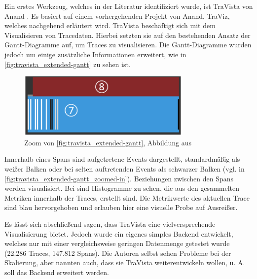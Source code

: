 Ein erstes Werkzeug, welches in der Literatur identifiziert wurde, ist TraVista von Anand \etal \cite{TraVistaPaper}. Es basiert auf einem vorhergehenden Projekt von Anand, TraViz, welches nachgehend erläutert wird. TraVista beschäftigt sich mit dem Visualisieren von Tracedaten. Hierbei setzten sie auf den bestehenden Ansatz der Gantt-Diagramme auf, um Traces zu visualisieren. Die Gantt-Diagramme wurden jedoch um einige zusätzliche Informationen erweitert, wie in \autoref{fig:travista_extended-gantt} zu sehen ist.

\begin{figure}
\centering
\vspace{-1.5\baselineskip}
\includegraphics[width=\linewidth]{img/03_methoden/travista_extended-gantt_zoomed-in.png}
\caption{Zoom von \autoref{fig:travista_extended-gantt}, Abbildung aus \cite{TraVistaPaper}}
\label{fig:travista_extended-gantt_zoomed-in}
\end{figure}

Innerhalb eines Spans sind aufgetretene Events dargestellt, standardmäßig als weißer Balken oder bei selten auftretenden Events als schwarzer Balken (vgl.  in \autoref{fig:travista_extended-gantt_zoomed-in}). Beziehungen  zwischen den Spans werden visualisiert. Bei  sind Histogramme zu sehen, die aus den gesammelten Metriken innerhalb der Traces, erstellt sind. Die Metrikwerte des aktuellen Trace sind blau hervorgehoben und erlauben hier eine visuelle Probe auf Ausreißer.

Es lässt sich abschließend sagen, dass TraVista eine vielversprechende Visualisierung bietet. Jedoch wurde ein eigenes simples Backend entwickelt, welches nur mit einer vergleichsweise geringen Datenmenge getestet wurde (22.286 Traces, 147.812 Spans). Die Autoren selbst sehen Probleme bei der Skalierung, aber nannten auch, dass sie TraVista weiterentwickeln wollen, u. A. soll das Backend erweitert werden.

